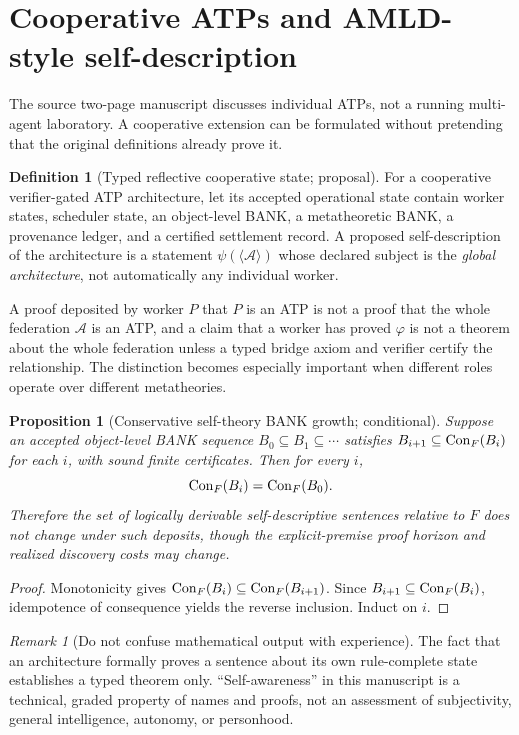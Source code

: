 \documentclass[11pt,letterpaper]{article}
\newtheorem{proposition}[theorem]{Proposition}
\theoremstyle{definition}\newtheorem{definition}[theorem]{Definition}\newtheorem{example}[theorem]{Example}\newtheorem{protocol}[theorem]{Protocol}\newtheorem{question}[theorem]{Open Problem}
\theoremstyle{remark}\newtheorem{remark}[theorem]{Remark}
\begin{document}
\section{Cooperative ATPs and AMLD-style self-description}
The source two-page manuscript discusses individual ATPs, not a running multi-agent laboratory. A cooperative extension can be formulated without pretending that the original definitions already prove it.
\begin{definition}[Typed reflective cooperative state; proposal]
For a cooperative verifier-gated ATP architecture, let its accepted operational state contain worker states, scheduler state, an object-level BANK, a metatheoretic BANK, a provenance ledger, and a certified settlement record. A proposed self-description of the architecture is a statement $\psi(\langle\mathcal A\rangle)$ whose declared subject is the \emph{global architecture}, not automatically any individual worker.
\end{definition}
A proof deposited by worker $P$ that $P$ is an ATP is not a proof that the whole federation $\mathcal A$ is an ATP, and a claim that a worker has proved $\varphi$ is not a theorem about the whole federation unless a typed bridge axiom and verifier certify the relationship. The distinction becomes especially important when different roles operate over different metatheories.
\begin{proposition}[Conservative self-theory BANK growth; conditional]
Suppose an accepted object-level BANK sequence $B_0\subseteq B_1\subseteq\cdots$ satisfies $B_{i+1}\subseteq\operatorname{Con}_F(B_i)$ for each $i$, with sound finite certificates. Then for every $i$,
\[
\operatorname{Con}_F(B_i)=\operatorname{Con}_F(B_0).
\]
Therefore the set of \emph{logically derivable} self-descriptive sentences relative to $F$ does not change under such deposits, though the explicit-premise proof horizon and realized discovery costs may change.
\end{proposition}
\begin{proof}
Monotonicity gives $\operatorname{Con}_F(B_i)\subseteq\operatorname{Con}_F(B_{i+1})$. Since $B_{i+1}\subseteq\operatorname{Con}_F(B_i)$, idempotence of consequence yields the reverse inclusion. Induct on $i$.
\end{proof}
\begin{remark}[Do not confuse mathematical output with experience]
The fact that an architecture formally proves a sentence about its own rule-complete state establishes a typed theorem only. ``Self-awareness'' in this manuscript is a technical, graded property of names and proofs, not an assessment of subjectivity, general intelligence, autonomy, or personhood.
\end{remark}
\end{document}
